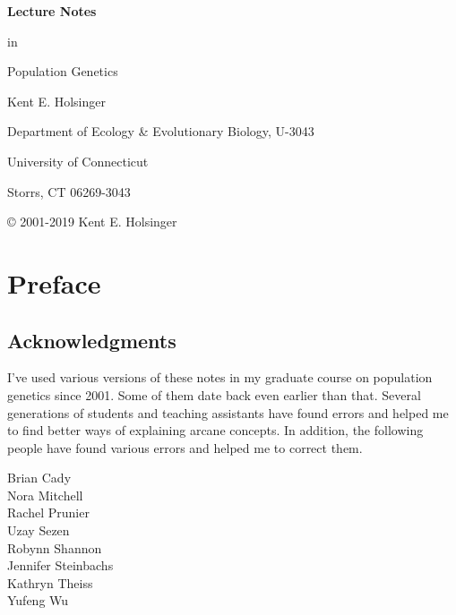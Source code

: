 \documentclass[12pt,titlepage,openright]{book}
\begin{document}
\begin{titlepage}

{\Large\bf \noindent Lecture Notes

\noindent in

\noindent Population Genetics

}

\vfill

{\noindent Kent E. Holsinger

\noindent Department of Ecology \& Evolutionary Biology, U-3043

\noindent University of Connecticut

\noindent Storrs, CT  06269-3043}

\vfill

\end{titlepage}


{\small\noindent \copyright{} 2001-2019 Kent E. Holsinger

\ccLicense}

\tableofcontents

\chapter*{Preface}

\section*{Acknowledgments}

I've used various versions of these notes in my graduate course on
population genetics
since 2001. Some of them date back even earlier than that. Several
generations of students and teaching assistants have found errors and
helped me to find better ways of explaining arcane concepts. In
addition, the following people have found various errors and helped me
to correct them.

\begin{multicols}{2}
\noindent Brian Cady \\
Nora Mitchell \\
Rachel Prunier \\
Uzay Sezen \\
Robynn Shannon \\
Jennifer Steinbachs \\
Kathryn Theiss \\
Yufeng Wu \\
\end{multicols}
\end{document}
